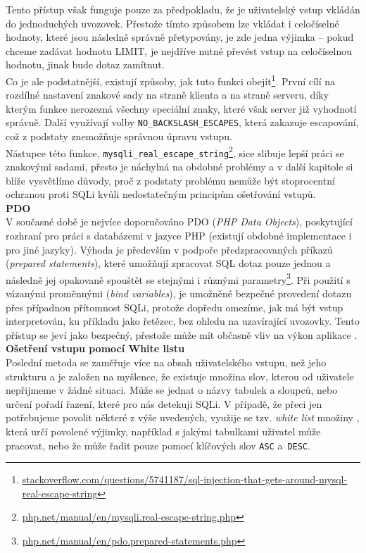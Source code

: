 Tento přístup však funguje pouze za předpokladu, že je uživatelský vstup vkládán do jednoduchých uvozovek. Přestože tímto způsobem lze vkládat
i celočíselné hodnoty, které jsou následně správně přetypovány, je zde jedna výjimka -- pokud chceme zadávat hodnotu LIMIT, je nejdříve nutné převést
vstup na celočíselnou hodnotu, jinak bude dotaz zamítnut. \\

Co je ale podstatnější, existují způsoby, jak tuto funkci 
obejít\footnote{\url{stackoverflow.com/questions/5741187/sql-injection-that-gets-around-mysql-real-escape-string}}. 
První cílí na rozdílné nastavení znakové sady na straně klienta a na straně serveru, díky kterým funkce nerozezná všechny speciální znaky,
které však server již vyhodnotí správně. Další využívají volby \texttt{NO\_BACKSLASH\_ESCAPES}, která zakazuje escapování,
což z podstaty znemožňuje správnou úpravu vstupu. \\

Nástupce této funkce, \texttt{mysqli\_real\_escape\_string}\footnote{\url{php.net/manual/en/mysqli.real-escape-string.php}}, sice slibuje lepší práci se znakovými sadami, 
přesto je náchylná na obdobné problémy a v další kapitole si blíže vysvětlíme důvody, proč z podstaty problému nemůže být stoprocentní ochranou proti SQLi kvůli 
nedostatečným principům ošetřování vstupů. \\

\Bat{} \textbf{PDO}\\
V současné době je nejvíce doporučováno PDO (\textit{PHP Data Objects}), poskytující rozhraní pro práci s databázemi v jazyce PHP (existují obdobné
implementace i pro jiné jazyky). Výhoda je především v podpoře předzpracovaných příkazů (\textit{prepared statements}), které umožňují zpracovat SQL dotaz 
pouze jednou a následně jej opakovaně spouštět se stejnými i různými parametry\footnote{\url{php.net/manual/en/pdo.prepared-statements.php}}. 
Při použití s vázanými proměnnými (\textit{bind variables}), je umožněné bezpečné provedení dotazu přes případnou přítomnost SQLi, protože dopředu
omezíme, jak má být vstup interpretován, ku příkladu jako řetězec, bez ohledu na uzavírající uvozovky. Tento přístup se jeví jako bezpečný,
přestože může mít občasně vliv na výkon aplikace \cite{OWASP2018}.\\

\Bat{} \textbf{Ošetření vstupu pomocí White listu}\\
Poslední metoda se zaměřuje více na obsah uživatelského vstupu, než jeho strukturu a je založen na myšlence, že existuje množina slov, kterou
od uživatele nepřijmeme v žádné situaci. Může se jednat o názvy tabulek a sloupců, nebo určení pořadí řazení, které pro nás detekuji SQLi. 
V případě, že přeci jen potřebujeme povolit některé z výše uvedených, využije se tzv. \textit{white list} množiny \cite{OWASP2018}, která určí povolené výjimky, 
například s jakými tabulkami uživatel může pracovat, nebo že může řadit pouze pomocí klíčových slov \texttt{ASC} a~\texttt{DESC}.

